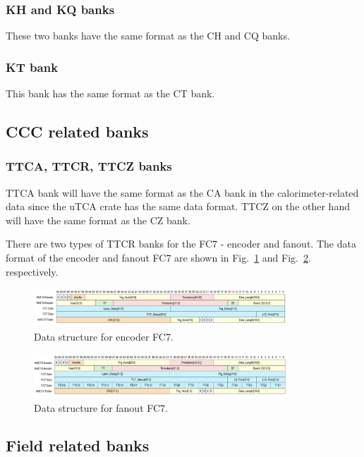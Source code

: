 \subsubsection*{KH and KQ banks}
These two banks have the same format as the CH and CQ banks.

\subsubsection*{KT bank}
This bank has the same format as the CT bank.

\subsection{CCC related banks}

\subsubsection*{TTCA, TTCR, TTCZ banks}

TTCA bank will have the same format as the CA bank in the calorimeter-related data since the uTCA crate has the same data format. TTCZ on the other hand will have the same format as the CZ bank.

There are two types of TTCR banks for the FC7 - encoder and fanout. 
The data format of the encoder and fanout FC7 are shown in Fig.~\ref{fig:EncoderFC7} and Fig.~\ref{fig:FanoutFC7}. respectively.

\begin{figure}[htbp]
\centering
\includegraphics[width=0.85\textwidth]{pics/EncoderFC7.pdf} 
\caption{Data structure for encoder FC7.}\label{fig:EncoderFC7}
\end{figure}

\begin{figure}[htbp]
\centering
\includegraphics[width=0.85\textwidth]{pics/FanoutFC7.pdf} 
\caption{Data structure for fanout FC7.}\label{fig:FanoutFC7}
\end{figure}


\subsection{Field related banks}

